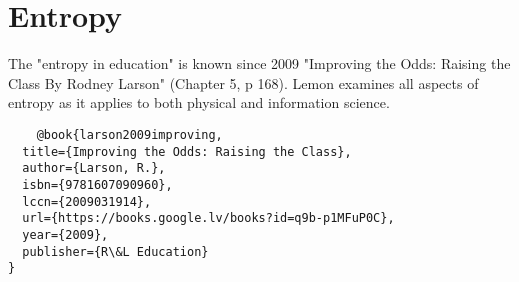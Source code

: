 \documentclass[runningheads,a4paper]{llncs}
\begin{document}
\section{Entropy}

The "entropy in education" is known since 2009 "Improving the Odds: Raising the Class
By Rodney Larson" (Chapter 5, p 168). Lemon examines all aspects of entropy as it applies to both physical and information science.

\begin{verbatim}
    @book{larson2009improving,
  title={Improving the Odds: Raising the Class},
  author={Larson, R.},
  isbn={9781607090960},
  lccn={2009031914},
  url={https://books.google.lv/books?id=q9b-p1MFuP0C},
  year={2009},
  publisher={R\&L Education}
}
\end{verbatim}






\end{document}
